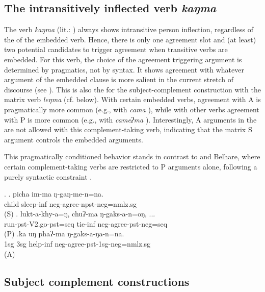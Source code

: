 	
\subsection{The intransitively inflected verb  \emph{kaŋma} }

The verb \emph{kaŋma}   (lit.: ) always shows intransitive person inflection, regardless of the  of the embedded verb. Hence, there is only one agreement slot and (at least) two potential candidates to trigger  agreement when transitive verbs are embedded. For this  verb, the choice of the agreement triggering argument is determined by pragmatics, not by syntax. It shows agreement with whatever argument of the embedded clause is more salient in the current stretch of discourse (see \Next). This is also the  for the subject-complement construction with the matrix verb \emph{leŋma}  (cf.  below). With certain embedded verbs, agreement with A is pragmatically more common (e.g., with \emph{cama} ), while with other  verbs agreement with P is more common (e.g., with \emph{cameʔma} ). Interestingly, A arguments in the   are not allowed with this complement-taking verb, indicating that the matrix S argument controls the embedded arguments.

This pragmatically conditioned behavior stands in contrast to  and Belhare, where certain complement-taking verbs are restricted to P arguments alone, following a purely syntactic constraint \citep{Bickeletal2001Syntactic, Bickeletal2010Ditransitives}. 

\ex. \ag. picha im-ma ŋ-gaŋ-me-n=na.\\
child sleep-{\sc inf} {\sc neg}-agree{\sc [3sg]-npst-neg=nmlz.sg}\\
 (S)
\bg. lukt-a-khy-a=ŋ, chuʔ-ma  ŋ-gaks-a-n=oŋ, ...\\
run{\sc [3sg]-pst-V2.go-pst=seq} tie{\sc -inf} {\sc neg-}agree{\sc [3sg]-pst-neg=seq}\\
 (P)  
\bg.ka uŋ phaʔ-ma ŋ-gaks-a-ŋa-n=na.\\
{\sc 1sg} {\sc 3sg} help{\sc -inf} {\sc neg-}agree{\sc -pst-1sg-neg=nmlz.sg}\\
 (A)


\subsection{Subject complement constructions}\label{subjectcomplement}


